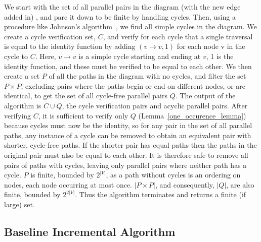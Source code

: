 \documentclass[sigplan,review,anonymous]{acmart}
\begin{document}
We start with the set of all parallel pairs in the diagram (with the new edge added in) , and pare it down to be finite by handling cycles.
Then, using a procedure like Johnson's algorithm~\cite{johnson}, we find all simple cycles in the diagram. 
We create a cycle verification set, $C$, and verify for each cycle that a single traversal is equal to the identity function by adding $(v \rightarrow v, 1)$ for each node v in the cycle to $C$.
Here, $v \rightarrow v$ is a simple cycle starting and ending at $v$, 1 is the identity function, and these must be verified to be equal to each other.
We then create a set $P$ of all the paths in the diagram with no cycles, and filter the set $P \times P$, excluding pairs where the paths begin or end on different nodes, or are identical, to get the set of all cycle-free parallel pairs $Q$.
The output of the algorithm is $C \cup Q$, the cycle verification pairs and acyclic parallel pairs.
After verifying $C$, it is sufficient to verify only $Q$ (Lemma~\ref{one_occurence_lemma}) because cycles must now be the identity, so for any pair in the set of all parallel paths, any instance of a cycle can be removed to obtain an equivalent pair with shorter, cycle-free paths.
If the shorter pair has equal paths then the paths in the original pair must also be equal to each other.
It is therefore safe to remove all pairs of paths with cycles, leaving only parallel pairs where neither path has a cycle.
$P$ is finite, bounded by $2^{|V|}$, as a path without cycles is an ordering on nodes, each node occurring at most once.
$|P \times P|$, and consequently, $|Q|$, are also finite, bounded by $2^{2|V|}$.
Thus the algorithm terminates and returns a finite (if large) set.

\subsection{Baseline Incremental Algorithm}
\end{document}
